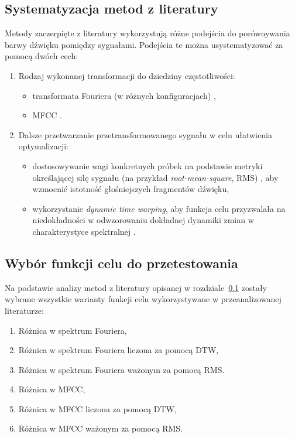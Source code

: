 \subsection{Systematyzacja metod z literatury} \label{sec:timbre_comparison_systematisation}

Metody zaczerpięte z literatury wykorzystują różne podejścia do porównywania barwy dźwięku
pomiędzy sygnałami. Podejścia te można usystematyzować za pomocą dwóch cech:

\begin{enumerate}
  \item Rodzaj wykonanej transformacji do dziedziny częstotliwości:
  \begin{itemize}
    \item transformata Fouriera (w różnych konfiguracjach) \cite{riffusion} \cite{ddx7},
    \item MFCC \cite{ieee_synth_programming} \cite{evolutionary_puredata} \cite{mfcc_dtw}.
  \end{itemize}
  \item Dalsze przetwarzanie przetransformowanego sygnału w celu ułatwienia optymalizacji:
    \begin{itemize}
      \item dostosowywanie wagi konkretnych próbek na podstawie metryki określającej siłę sygnału
        (na przykład \textit{root-mean-square}, RMS)
        \cite{parallel_evolutionary_optimization_synth_parameters},
        aby wzmocnić istotność głośniejszych fragmentów dźwięku,
      \item wykorzystanie \textit{dynamic time warping}, aby funkcja celu przyzwalała na
        niedokładności w odwzorowaniu dokładnej dynamiki zmian w charakterystyce spektralnej \cite{mfcc_dtw}.
    \end{itemize}
\end{enumerate}

\subsection{Wybór funkcji celu do przetestowania}

Na podstawie analizy metod z literatury opisanej w rozdziale~\ref{sec:timbre_comparison_systematisation} zostały wybrane wszystkie warianty
funkcji celu wykorzystywane w przeanalizowanej literaturze:

\begin{enumerate}
  \item Różnica w spektrum Fouriera,
  \item Różnica w spektrum Fouriera liczona za pomocą DTW,
  \item Różnica w spektrum Fouriera ważonym za pomocą RMS.
  \item Różnica w MFCC,
  \item Różnica w MFCC liczona za pomocą DTW,
  \item Różnica w MFCC ważonym za pomocą RMS.
\end{enumerate}

